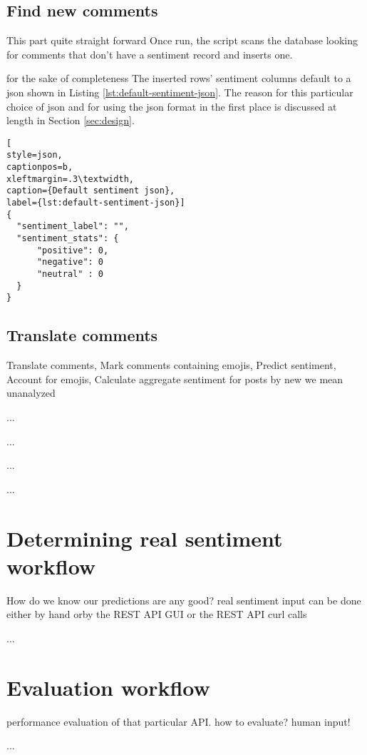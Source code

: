 

\subsection*{Find new comments\label{sec:find-new-comments}}
This part  quite straight forward 
 Once run, the script scans the database looking for comments that don't have a sentiment record and inserts one.  

 for the sake of completeness
The inserted rows' sentiment columns default to a json shown in Listing \ref{lst:default-sentiment-json}. The reason for this particular choice of json and for using the json format in the first place is discussed at length in Section \ref{sec:design}.

\begin{lstlisting}[
style=json,
captionpos=b,
xleftmargin=.3\textwidth,
caption={Default sentiment json},
label={lst:default-sentiment-json}]
{
  "sentiment_label": "",
  "sentiment_stats": {
      "positive": 0,
      "negative": 0
      "neutral" : 0
  }
}
\end{lstlisting}
\subsection*{Translate comments \label{sec:translate-comments}}
        Translate comments,{}
        Mark comments containing emojis, 
        Predict sentiment,
		Account for emojis, 
        Calculate aggregate sentiment for posts
by new we mean unanalyzed

...

...

...

...



\section{Determining real sentiment workflow\label{sec:determining-real-sentiment-workflow}}
How do we know our predictions are any good?
real sentiment input can be done either by hand orby the REST API GUI or the REST API curl calls

...





\section{Evaluation workflow\label{sec:sentiment-evaluation-workflow}}


performance evaluation of that particular API.
how to evaluate? human input! 

...



